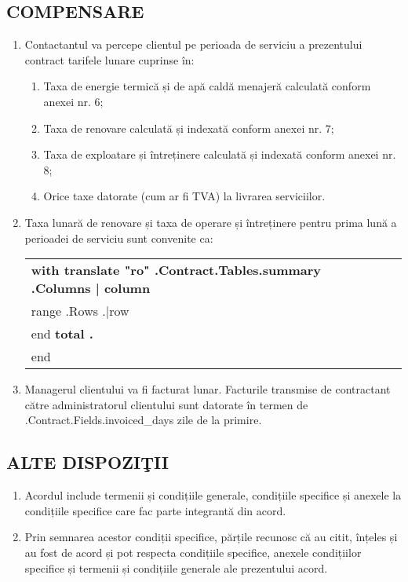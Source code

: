 \subsection{COMPENSARE}
\begin{enumerate}
	\item Contactantul va percepe clientul pe perioada de serviciu a prezentului contract tarifele lunare cuprinse în:
	\begin{enumerate}
		\item Taxa de energie termică și de apă caldă menajeră calculată conform anexei  nr. 6;
		\item Taxa de renovare calculată și indexată conform anexei  nr. 7;
		\item Taxa de exploatare și întreținere calculată și indexată conform anexei nr. 8;
		\item Orice taxe datorate (cum ar fi TVA) la livrarea serviciilor.
	\end{enumerate}
	\item Taxa lunară de renovare și taxa de operare și întreținere pentru prima lună a perioadei de serviciu sunt convenite ca:


\begin{center}
	\begin{tabu}{|X|X|X|X|}\tabucline{}\rowfont[c]\bfseries
	{{with translate "ro" .Contract.Tables.summary}} %
	{{.Columns | column}} \\\tabucline{}
	{{range .Rows}} %
	{{.|row}} \\\tabucline{}
	{{end}}
	\bfseries {{total .}} \\\tabucline{} %
	{{end}}
	\end{tabu}
\end{center}

\item Managerul clientului va fi facturat lunar. Facturile transmise de contractant către administratorul clientului sunt datorate în termen de \iffalse input fields.invoiced_days value="{{.Contract.Fields.invoiced_days}}" \fi {{.Contract.Fields.invoiced_days}} zile de la primire.
\end{enumerate}

\subsection{ALTE DISPOZIŢII}
\begin{enumerate}
	\item Acordul include termenii și condițiile generale, condițiile specifice și anexele la condițiile specifice care fac parte integrantă din acord.
	\item Prin semnarea acestor condiții specifice, părțile recunosc că au citit, înțeles și au fost de acord și pot respecta condițiile specifice, anexele condițiilor specifice și termenii și condițiile generale ale prezentului acord.
\end{enumerate}

